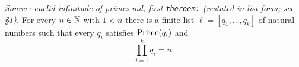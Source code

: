 \begin{theorem}
  \leanok
  \label{thm:exists_factorization}
  \textit{Source: euclid-infinitude-of-primes.md, first \texttt{theroem:} (restated in list form; see \S1).}
  For every $n \in \mathbb{N}$ with $1 < n$ there is a finite list
  $\ell = [q_1, \dots, q_k]$ of natural numbers such that every $q_i$ satisfies
  $\mathrm{Prime}(q_i)$ and
  \[
    \prod_{i=1}^{k} q_i = n .
  \]
\end{theorem}

